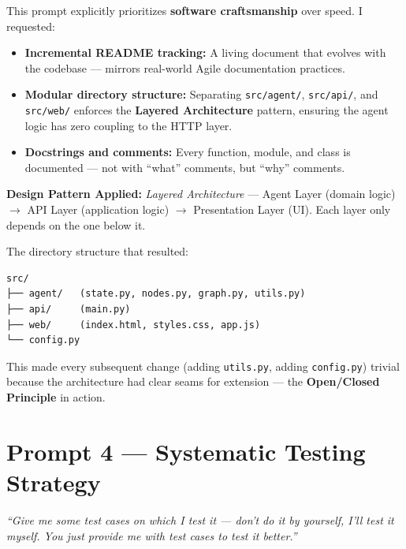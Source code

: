 \documentclass[12pt, a4paper]{article}
\begin{document}
\begin{reasonbox}
This prompt explicitly prioritizes \textbf{software craftsmanship} over speed. I requested:

\begin{itemize}[leftmargin=1.5em]
    \item \textbf{Incremental README tracking:} A living document that evolves with the codebase — mirrors real-world Agile documentation practices.
    \item \textbf{Modular directory structure:} Separating \texttt{src/agent/}, \texttt{src/api/}, and \texttt{src/web/} enforces the \textbf{Layered Architecture} pattern, ensuring the agent logic has zero coupling to the HTTP layer.
    \item \textbf{Docstrings and comments:} Every function, module, and class is documented — not with ``what'' comments, but ``why'' comments.
\end{itemize}

\textbf{Design Pattern Applied:} \textit{Layered Architecture} — Agent Layer (domain logic) $\to$ API Layer (application logic) $\to$ Presentation Layer (UI). Each layer only depends on the one below it.
\end{reasonbox}

\begin{impactbox}
The directory structure that resulted:
\begin{verbatim}
src/
├── agent/   (state.py, nodes.py, graph.py, utils.py)
├── api/     (main.py)
├── web/     (index.html, styles.css, app.js)
└── config.py
\end{verbatim}
This made every subsequent change (adding \texttt{utils.py}, adding \texttt{config.py}) trivial because the architecture had clear seams for extension — the \textbf{Open/Closed Principle} in action.
\end{impactbox}

\section{Prompt 4 — Systematic Testing Strategy}

\begin{promptbox}
\textit{``Give me some test cases on which I test it — don't do it by yourself, I'll test it myself. You just provide me with test cases to test it better.''}
\end{promptbox}
\end{document}
